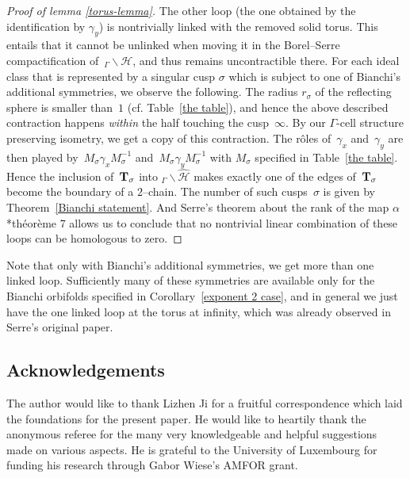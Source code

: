 \documentclass[twoside,a4paper,12 pt]{amsart}
\newcommand{\Hy}{\mathcal{H}}
\newcommand{\T}{{\bf{T}}}
\theoremstyle{plain}
\theoremstyle{definition}
\theoremstyle{remark}
\begin{document}
\begin{proof}[Proof of lemma \ref{torus-lemma}]
 The other loop (the one obtained by the identification by  $\gamma_y$) is nontrivially linked with the removed solid torus.
 This entails that it cannot be unlinked when moving it in the Borel--Serre compactification of~$_\Gamma \backslash \Hy$,
 and thus remains uncontractible there.
 For each ideal class that is represented by a singular cusp $\sigma$ which is subject to one of Bianchi's additional symmetries, we observe the following.
  The radius $r_\sigma$ of the reflecting sphere is smaller than~$1$ (cf. Table~\ref{the table}), 
  and hence the above described contraction happens \textit{within} the half touching the cusp~$\infty$.
 By our $\Gamma$-cell structure preserving isometry, we get a copy of this contraction.
 The r\^oles of~$\gamma_x$ and~$\gamma_y$ are then played by~$M_\sigma\gamma_xM_\sigma^{-1}$ and~$M_\sigma\gamma_y M_\sigma^{-1}$ with $M_\sigma$ specified in Table~\ref{the table}.
 Hence the inclusion of~$\T_\sigma$ into $_\Gamma \backslash \widehat{\Hy}$ makes exactly one of the edges of~$\T_\sigma$ become the boundary of a $2$--chain.
 The number of such cusps~$\sigma$ is given by Theorem~\ref{Bianchi statement}.
 And Serre's theorem about the rank of the map $\alpha$ \cite{Serre}*{th\'eor\`eme 7} allows us to conclude that no nontrivial linear combination of these loops can be homologous to zero.
 \end{proof}

Note that only with Bianchi's additional symmetries, we get more than one linked loop.
Sufficiently many of these symmetries are available only for the Bianchi orbifolds specified in Corollary~\ref{exponent 2 case},
and in general we just have the one linked loop at the torus at infinity, which was already observed in Serre's original paper.


\subsection*{Acknowledgements}
The author would like to thank Lizhen Ji for a fruitful correspondence which laid the foundations for the present paper.
He would like to heartily thank the anonymous referee for the many very knowledgeable and helpful suggestions made on various aspects.
He is grateful to the University of Luxembourg for funding his research through Gabor Wiese's AMFOR grant.
\end{document}
